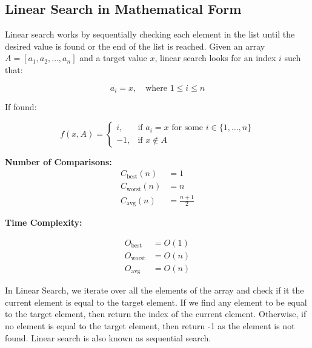 \documentclass{article}
\begin{document}
  \vfill\null

  \subsection{Linear Search in Mathematical Form}
  
  
  Linear search works by sequentially checking each element in the list until the desired value is found or the end of the list is reached.
  Given an array $A = [a_1, a_2, \dots, a_n]$ and a target value $x$, linear search looks for an index $i$ such that:
  
  \[
  a_i = x, \quad \text{where } 1 \leq i \leq n
  \]
  
  If found:
  
  \[
  f(x, A) =
  \begin{cases}
  i, & \text{if } a_i = x \text{ for some } i \in \{1, \dots, n\} \\
  -1, & \text{if } x \notin A
  \end{cases}
  \]
  
  \textbf{Number of Comparisons:}
  \[
  \begin{aligned}
  C_{\text{best}}(n) &= 1 \\
  C_{\text{worst}}(n) &= n \\
  C_{\text{avg}}(n) &= \frac{n + 1}{2}
  \end{aligned}
  \]
  
  \textbf{Time Complexity:}
  
  \[
  \begin{aligned}
  O_{\text{best}} &= O(1) \\
  O_{\text{worst}} &= O(n) \\
  O_{\text{avg}} &= O(n)
  \end{aligned}
  \]

  In Linear Search, we iterate over all the elements of the array and check if it the current element is equal to the target element. If we find any element to be equal to the target element, then return the index of the current element. Otherwise, if no element is equal to the target element, then return -1 as the element is not found. Linear search is also known as sequential search.
  
\end{document}
